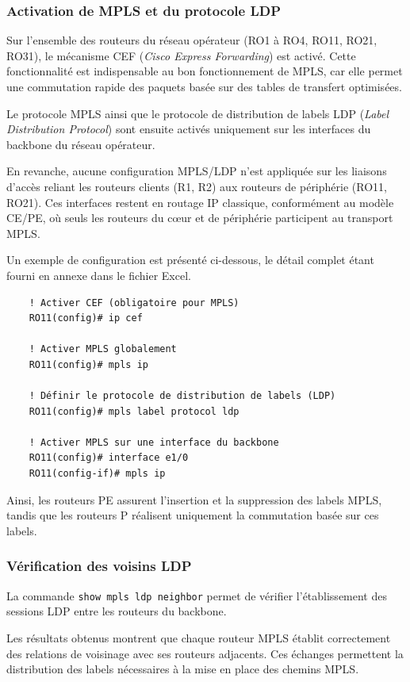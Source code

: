 \documentclass[12pt,a4paper, oneside]{memoir}
\begin{document}
\subsubsection{Activation de MPLS et du protocole LDP}

Sur l’ensemble des routeurs du réseau opérateur (RO1 à RO4, RO11, RO21, RO31), le mécanisme CEF (\textit{Cisco Express Forwarding}) est activé. Cette fonctionnalité est indispensable au bon fonctionnement de MPLS, car elle permet une commutation rapide des paquets basée sur des tables de transfert optimisées.

Le protocole MPLS ainsi que le protocole de distribution de labels LDP (\textit{Label Distribution Protocol}) sont ensuite activés uniquement sur les interfaces du backbone du réseau opérateur.

En revanche, aucune configuration MPLS/LDP n’est appliquée sur les liaisons d’accès reliant les routeurs clients (R1, R2) aux routeurs de périphérie (RO11, RO21). Ces interfaces restent en routage IP classique, conformément au modèle CE/PE, où seuls les routeurs du cœur et de périphérie participent au transport MPLS.

Un exemple de configuration est présenté ci-dessous, le détail complet étant fourni en annexe dans le fichier Excel.

\begin{verbatim}
	! Activer CEF (obligatoire pour MPLS)
	RO11(config)# ip cef
	
	! Activer MPLS globalement
	RO11(config)# mpls ip
	
	! Définir le protocole de distribution de labels (LDP)
	RO11(config)# mpls label protocol ldp
	
	! Activer MPLS sur une interface du backbone
	RO11(config)# interface e1/0
	RO11(config-if)# mpls ip
\end{verbatim}

Ainsi, les routeurs PE assurent l’insertion et la suppression des labels MPLS, tandis que les routeurs P réalisent uniquement la commutation basée sur ces labels.

\subsubsection{Vérification des voisins LDP}

La commande \texttt{show mpls ldp neighbor} permet de vérifier l’établissement des sessions LDP entre les routeurs du backbone.

Les résultats obtenus montrent que chaque routeur MPLS établit correctement des relations de voisinage avec ses routeurs adjacents. Ces échanges permettent la distribution des labels nécessaires à la mise en place des chemins MPLS.
\end{document}
